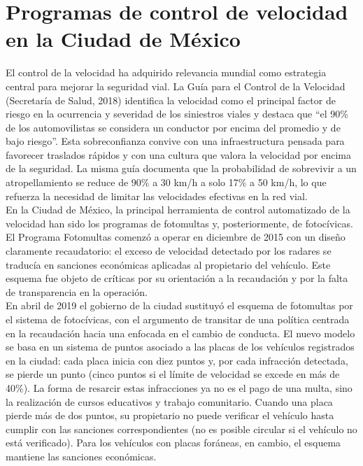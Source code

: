 \section{Programas de control de velocidad en la Ciudad de México}
\noindent El control de la velocidad ha adquirido relevancia mundial como estrategia central para mejorar la seguridad vial. La Guía para el Control de la Velocidad (Secretaría de Salud, 2018) identifica la velocidad como el principal factor de riesgo en la ocurrencia y severidad de los siniestros viales y destaca que “el 90\% de los automovilistas se considera un conductor por encima del promedio y de bajo riesgo”. Esta sobreconfianza convive con una infraestructura pensada para favorecer traslados rápidos y con una cultura que valora la velocidad por encima de la seguridad. La misma guía documenta que la probabilidad de sobrevivir a un atropellamiento se reduce de 90\% a 30 km/h a solo 17\% a 50 km/h, lo que refuerza la necesidad de limitar las velocidades efectivas en la red vial.\\

\indent En la Ciudad de México, la principal herramienta de control automatizado de la velocidad han sido los programas de fotomultas y, posteriormente, de fotocívicas. El Programa Fotomultas comenzó a operar en diciembre de 2015 con un diseño claramente recaudatorio: el exceso de velocidad detectado por los radares se traducía en sanciones económicas aplicadas al propietario del vehículo. Este esquema fue objeto de críticas por su orientación a la recaudación y por la falta de transparencia en la operación.\\

En abril de 2019 el gobierno de la ciudad sustituyó el esquema de fotomultas por el sistema de fotocívicas, con el argumento de transitar de una política centrada en la recaudación hacia una enfocada en el cambio de conducta. El nuevo modelo se basa en un sistema de puntos asociado a las placas de los vehículos registrados en la ciudad: cada placa inicia con diez puntos y, por cada infracción detectada, se pierde un punto (cinco puntos si el límite de velocidad se excede en más de 40\%). La forma de resarcir estas infracciones ya no es el pago de una multa, sino la realización de cursos educativos y trabajo comunitario. Cuando una placa pierde más de dos puntos, su propietario no puede verificar el vehículo hasta cumplir con las sanciones correspondientes (no es posible circular si el vehículo no está verificado). Para los vehículos con placas foráneas, en cambio, el esquema mantiene las sanciones económicas.\\

